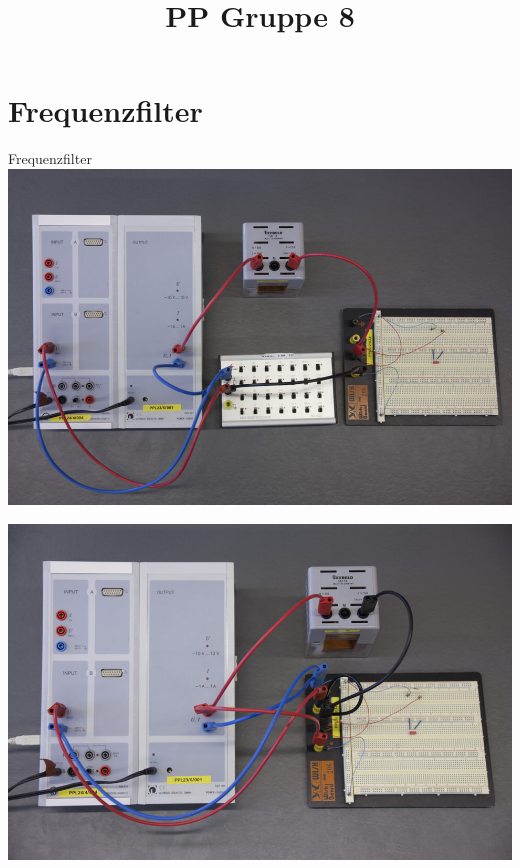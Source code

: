 \documentclass[11pt]{beamer}
\title{PP Gruppe 8}
\begin{document}
\frame[c]{\titlepage}
\begin{frame}
\tableofcontents
\end{frame}


\section{Frequenzfilter}
\begin{frame}{Frequenzfilter}
	\includegraphics[width=\textwidth]{images/1/durchlassfilter}
\end{frame}

\begin{frame}
	\includegraphics[width=\textwidth]{images/1/sperrfilter}
\end{frame}
\end{document}
